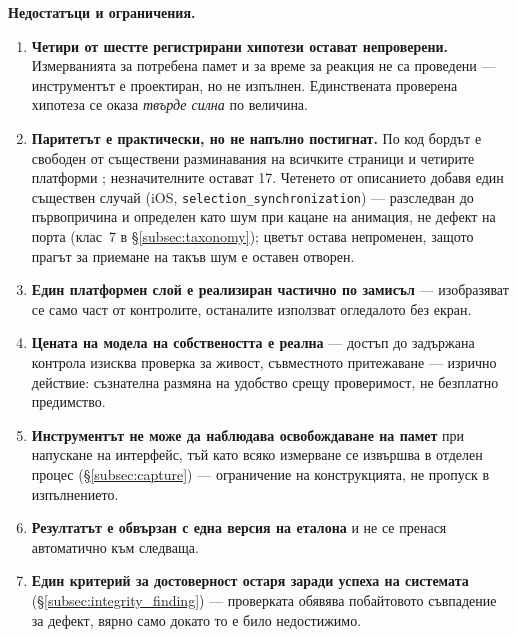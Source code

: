 \textbf{Недостатъци и ограничения.}
\begin{enumerate}[topsep=2pt,itemsep=2pt,leftmargin=*]
\item \textbf{Четири от шестте регистрирани хипотези остават непроверени.} Измерванията за
      потребена памет и за време за реакция не са проведени --- инструментът е проектиран, но не
      изпълнен. Единствената проверена хипотеза се оказа \emph{твърде силна} по величина.
\item \textbf{Паритетът е практически, но не напълно постигнат.} По код бордът е свободен от
      съществени разминавания на всичките \boardPages{} страници и четирите платформи
      ; незначителните остават 17. Четенето от описанието добавя един
      съществен случай (iOS, \texttt{selection\_synchronization})  ---
      разследван до първопричина и определен като шум при кацане на анимация, не дефект на порта
      (клас~7 в §\ref{subsec:taxonomy}); цветът остава непроменен, защото прагът за приемане на
      такъв шум е оставен отворен.
\item \textbf{Един платформен слой е реализиран частично по замисъл} --- изобразяват се само част
      от контролите, останалите използват огледалото без екран.
\item \textbf{Цената на модела на собствеността е реална} --- достъп до задържана контрола
      изисква проверка за живост, съвместното притежаване --- изрично действие: съзнателна размяна
      на удобство срещу проверимост, не безплатно предимство.
\item \textbf{Инструментът не може да наблюдава освобождаване на памет} при напускане на
      интерфейс, тъй като всяко измерване се извършва в отделен процес (§\ref{subsec:capture})
      --- ограничение на конструкцията, не пропуск в изпълнението.
\item \textbf{Резултатът е обвързан с една версия на еталона} и не се пренася автоматично към
      следваща.
\item \textbf{Един критерий за достоверност остаря заради успеха на системата}
      (§\ref{subsec:integrity_finding}) --- проверката обявява побайтовото съвпадение за дефект,
      вярно само докато то е било недостижимо.
\end{enumerate}

